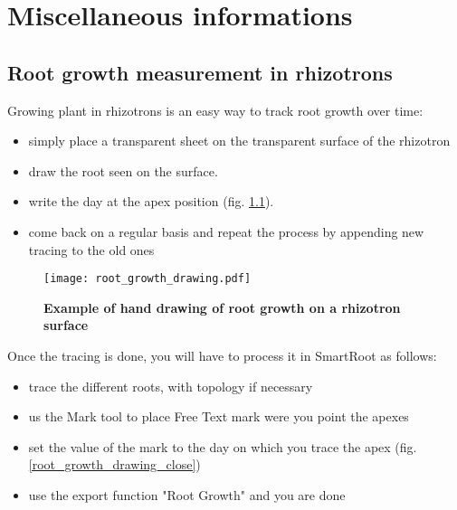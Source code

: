 \documentclass[a4paper,english,10pt]{report}
\begin{document}



\chapter{Miscellaneous informations}


{\color{coolSection}\section{Root growth measurement in rhizotrons}}
\label{root_growth}

Growing plant in rhizotrons is an easy way to track root growth over time:

\begin{itemize}
\item simply place a transparent sheet on the transparent surface of the rhizotron
\item draw the root seen on the surface.
\item write the day at the apex position (fig. \ref{root_growth_drawing}).
\item come back on a regular basis and repeat the process by appending new tracing to the old ones
\end{itemize}

\begin{figure}[htbp]
\begin{center}
\texttt{[image: root\_growth\_drawing.pdf]}
\caption[Root growth drawing]{\textbf{Example of hand drawing of root growth on a rhizotron surface}}
\label{root_growth_drawing}
\end{center}
\end{figure}

Once the tracing is done, you will have to process it in SmartRoot as follows:

\begin{itemize}
\item trace the different roots, with topology if necessary
\item us the Mark tool to place Free Text mark were you point the apexes
\item set the value of the mark to the day on which you trace the apex (fig. \ref{root_growth_drawing_close})
\item use the export function "Root Growth" and you are done
\end{itemize}
\end{document}
